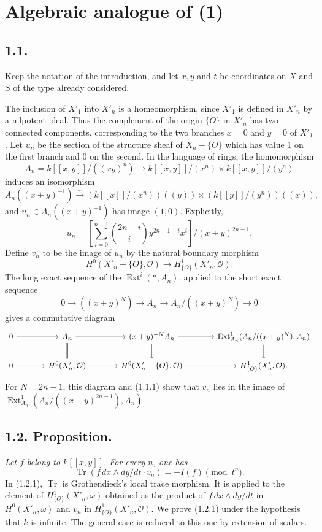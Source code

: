 \documentclass[11pt]{article}
\DeclareMathOperator{\Ext}{Ext}
\DeclareMathOperator{\Tr}{Tr}
\newcommand{\OO}{\mathcal O}
\begin{document}
\section{Algebraic analogue of (1)}

\subsection*{1.1.}
Keep the notation of the introduction, and let $x,y$ and $t$ be coordinates on $X$ and $S$ of the type already considered.

The inclusion of $X'_1$ into $X'_n$ is a homeomorphism, since $X'_1$ is defined in $X'_n$ by a nilpotent ideal. Thus the complement of the origin $\{O\}$ in $X'_n$ has two connected components, corresponding to the two branches $x=0$ and $y=0$ of $X'_1$. Let $u_n$ be the section of the structure sheaf of $X_n-\{O\}$ which has value 1 on the first branch and 0 on the second. In the language of rings, the homomorphism
\[
        A_n=k[[x,y]]/((xy)^n)\longrightarrow k[[x,y]]/(x^n)\times k[[x,y]]/(y^n)
\]
induces an isomorphism
\[
        A_n((x+y)^{-1})\xrightarrow{\sim}
        (k[[x]]/(x^n))((y))\times(k[[y]]/(y^n))((x)),
\]
and $u_n\in A_n((x+y)^{-1})$ has image $(1,0)$. Explicitly,
\begin{equation}
        u_n=\left[\sum_{i=0}^{n-1}\binom{2n-i}{i}y^{2n-1-i}x^i\right]\big/(x+y)^{2n-1}. \tag{1.1.1}
\end{equation}
Define $v_n$ to be the image of $u_n$ by the natural boundary morphism
\[
        H^0(X'_n-\{O\},\OO)\longrightarrow H^1_{\{O\}}(X'_n,\OO).
\]
The long exact sequence of the $\Ext^i(*,A_n)$, applied to the short exact sequence
\[
        0\longrightarrow ((x+y)^N)\longrightarrow A_n\longrightarrow A_n/((x+y)^N)\longrightarrow0
\]
gives a commutative diagram
\[
\begin{tikzcd}[column sep=large]
0 \arrow[r] & A_n \arrow[r] \arrow[d,equal] & (x+y)^{-N}A_n \arrow[r] \arrow[d] & \Ext^1_{A_n}(A_n/((x+y)^N),A_n) \arrow[d] \\
0 \arrow[r] & H^0(X'_n,\OO) \arrow[r] & H^0(X'_n-\{O\},\OO) \arrow[r] & H^1_{\{O\}}(X'_n,\OO).
\end{tikzcd}
\]
For $N=2n-1$, this diagram and (1.1.1) show that $v_n$ lies in the image of $\Ext^1_{A_n}(A_n/((x+y)^{2n-1}),A_n)$.

\subsection*{1.2. Proposition.}
\emph{Let $f$ belong to $k[[x,y]]$. For every $n$, one has}
\begin{equation}
        \Tr(f\,dx\wedge dy/dt\cdot v_n)=-I(f)\pmod {t^n}. \tag{1.2.1}
\end{equation}
In (1.2.1), $\Tr$ is Grothendieck's local trace morphism. It is applied to the element of $H^1_{\{O\}}(X'_n,\omega)$ obtained as the product of $f\,dx\wedge dy/dt$ in $H^0(X'_n,\omega)$ and $v_n$ in $H^1_{\{O\}}(X'_n,\OO)$. We prove (1.2.1) under the hypothesis that $k$ is infinite. The general case is reduced to this one by extension of scalars.
\end{document}
